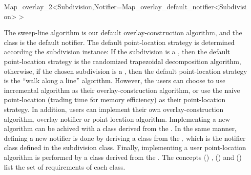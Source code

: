 \begin{ccRefClass}{Map_overlay_2<Subdivision,Notifier=Map_overlay_default_notifier<Subdivision> >}
\begin{ccAdvanced}
The sweep-line algorithm is our default overlay-construction algorithm,
and the  class is the default notifier.
The default point-location strategy is determined according the subdivision instance:
If the subdivision is a , then the default point-location 
strategy is the randomized trapezoidal decomposition algorithm, otherwise,
if the chosen subdivision is a , then 
the default point-location strategy is the ``walk along a line'' algorithm. 
However, the users can choose to use incremental algorithm as their overlay-construction 
algorithm, or use the naive point-location (trading time for memory efficiency) as 
their point-location strategy.
In addition, users can implement their own overlay-construction algorithm, 
overlay notifier or point-location algorithm. 
Implementing a new algorithm can be achived with a class derived from the 
. 
In the same manner, defining a new notifier is done by deriving a class from the 
, which is the 
notifier class defined in the subdivision class.
Finally, implementing a user point-location algorithm is performed by a 
class derived from the .
The concepts  ()
,  () and 
 () 
list the set of requirements of each class.

  


  




\end{ccAdvanced}
\end{ccRefClass}

